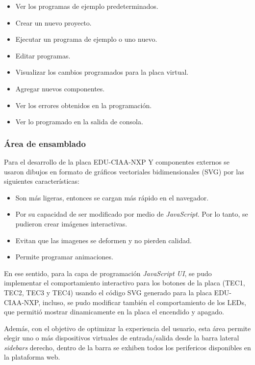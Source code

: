 \begin{itemize}
	\item Ver los programas de ejemplo predeterminados.
	\item Crear un nuevo proyecto.
	\item Ejecutar un programa de ejemplo o uno nuevo.
	\item Editar programas.
	\item Visualizar los cambios programados para la placa virtual.
	\item Agregar nuevos componentes.
	\item Ver los errores obtenidos en la programación.
	\item Ver lo programado en la salida de consola.
\end{itemize}

\subsubsection{Área de ensamblado}

Para el desarrollo de la placa EDU-CIAA-NXP Y componentes externos se usaron dibujos en formato de gráficos vectoriales bidimensionales (SVG) por las siguientes características:

\begin{itemize}
	\item Son más ligeras, entonces se cargan más rápido en el navegador.
    \item Por su capacidad de ser modificado por medio de \textit{JavaScript}. Por lo tanto, se pudieron crear imágenes interactivas.
	\item Evitan que las imagenes se deformen y no pierden calidad.
	\item Permite programar animaciones.
\end{itemize}

En ese sentido, para la capa de programación \textit{JavaScript UI}, se pudo implementar el comportamiento interactivo para los botones de la placa (TEC1, TEC2, TEC3 y TEC4) usando el código SVG generado para la placa EDU-CIAA-NXP, incluso, se pudo modificar también el comportamiento de los LEDs, que permitió mostrar dinamicamente en la placa el encendido y apagado.

Además, con el objetivo de optimizar la experiencia del usuario, esta área permite elegir uno o más dispositivos virtuales de entrada/salida desde la barra lateral \textit{sidebars} derecho, dentro de la barra se exhiben todos los perifericos disponibles en la plataforma web. 

